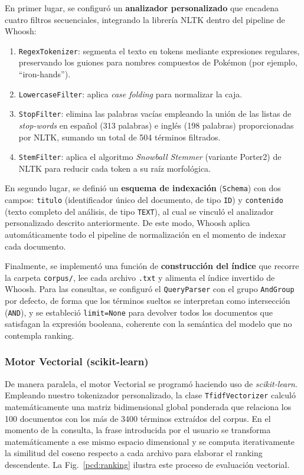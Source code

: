 \documentclass[conference,a4paper]{IEEEtran}
\def\figurename{Fig.}
\begin{document}
En primer lugar, se configuró un \textbf{analizador personalizado} que encadena cuatro filtros secuenciales, integrando la librería NLTK dentro del pipeline de Whoosh:
\begin{enumerate}
\item \texttt{RegexTokenizer}: segmenta el texto en tokens mediante expresiones regulares, preservando los guiones para nombres compuestos de Pokémon (por ejemplo, ``iron-hands'').
\item \texttt{LowercaseFilter}: aplica \emph{case folding} para normalizar la caja.
\item \texttt{StopFilter}: elimina las palabras vacías empleando la unión de las listas de \emph{stop-words} en español (313 palabras) e inglés (198 palabras) proporcionadas por NLTK, sumando un total de 504 términos filtrados.
\item \texttt{StemFilter}: aplica el algoritmo \emph{Snowball Stemmer} (variante Porter2) de NLTK para reducir cada token a su raíz morfológica.
\end{enumerate}

En segundo lugar, se definió un \textbf{esquema de indexación} (\texttt{Schema}) con dos campos: \texttt{titulo} (identificador único del documento, de tipo \texttt{ID}) y \texttt{contenido} (texto completo del análisis, de tipo \texttt{TEXT}), al cual se vinculó el analizador personalizado descrito anteriormente. De este modo, Whoosh aplica automáticamente todo el pipeline de normalización en el momento de indexar cada documento.

Finalmente, se implementó una función de \textbf{construcción del índice} que recorre la carpeta \texttt{corpus/}, lee cada archivo \texttt{.txt} y alimenta el índice invertido de Whoosh. Para las consultas, se configuró el \texttt{QueryParser} con el grupo \texttt{AndGroup} por defecto, de forma que los términos sueltos se interpretan como intersección (\texttt{AND}), y se estableció \texttt{limit=None} para devolver todos los documentos que satisfagan la expresión booleana, coherente con la semántica del modelo que no contempla ranking.

\subsubsection{Motor Vectorial (scikit-learn)}

De manera paralela, el motor Vectorial se programó haciendo uso de \emph{scikit-learn}. Empleando nuestro tokenizador personalizado, la clase \texttt{TfidfVectorizer} calculó matemáticamente una matriz bidimensional global ponderada que relaciona los 100 documentos con los más de 3400 términos extraídos del corpus. En el momento de la consulta, la frase introducida por el usuario se transforma matemáticamente a ese mismo espacio dimensional y se computa iterativamente la similitud del coseno respecto a cada archivo para elaborar el ranking descendente. La \figurename~\ref{pcd:ranking} ilustra este proceso de evaluación vectorial.
\end{document}
